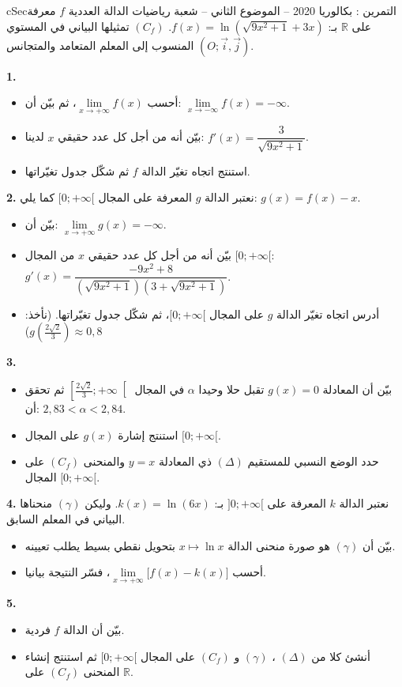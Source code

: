 \documentclass[12pt,a4paper]{article}
\newenvironment{BOX}[2]{\begin{otherlanguage}{english}\begin{arbox}{#1}{#2}}{\end{arbox}\end{otherlanguage}}
\newcounter{exo}
\newenvironment{tamrin}[1]{\stepcounter{exo}\begin{BOX}{cSec}{التمرين \theexo: #1}}{\end{BOX}}
\newcommand{\R}{\mathbb{R}}
\newenvironment{sq}{\begin{itemize}[leftmargin=2.4em,itemsep=3pt]}{\end{itemize}}
\newcommand{\qa}{\item[(أ)]}\newcommand{\qb}{\item[(ب)]}\newcommand{\qc}{\item[(جـ)]}\newcommand{\qd}{\item[(د)]}\newcommand{\qe}{\item[(هـ)]}
\newcommand{\QQ}[1]{\par\smallskip\textbf{#1.} }
\begin{document}
\begin{tamrin}{بكالوريا 2020 -- الموضوع الثاني -- شعبة رياضيات}
الدالة العددية $f$ معرفة على $\R$ بـ: $f(x)=\ln\left(\sqrt{9x^2+1}+3x\right)$.
$(C_f)$ تمثيلها البياني في المستوي المنسوب إلى المعلم المتعامد والمتجانس $(O;\vec i,\vec j)$.
\QQ{1}
\begin{sq}
\qa أحسب $\lim\limits_{x\to +\infty}f(x)$، ثم بيّن أن: $\lim\limits_{x\to -\infty}f(x)=-\infty$.
\qb بيّن أنه من أجل كل عدد حقيقي $x$ لدينا: $f'(x)=\dfrac{3}{\sqrt{9x^2+1}}$.
\qc استنتج اتجاه تغيّر الدالة $f$ ثم شكّل جدول تغيّراتها.
\end{sq}
\QQ{2} نعتبر الدالة $g$ المعرفة على المجال $[0;+\infty[$ كما يلي: $g(x)=f(x)-x$.
\begin{sq}
\qa بيّن أن: $\lim\limits_{x\to +\infty}g(x)=-\infty$.
\qb بيّن أنه من أجل كل عدد حقيقي $x$ من المجال $[0;+\infty[$: $g'(x)=\dfrac{-9x^2+8}{\left(\sqrt{9x^2+1}\right)\left(3+\sqrt{9x^2+1}\right)}$.
\qc أدرس اتجاه تغيّر الدالة $g$ على المجال $[0;+\infty[$، ثم شكّل جدول تغيّراتها. (نأخذ: $g\left(\frac{2\sqrt2}{3}\right)\approx 0{,}8$)
\end{sq}
\QQ{3}
\begin{sq}
\qa بيّن أن المعادلة $g(x)=0$ تقبل حلا وحيدا $\alpha$ في المجال $\left[\frac{2\sqrt2}{3};+\infty\right[$ ثم تحقق أن: $2{,}83<\alpha<2{,}84$.
\qb استنتج إشارة $g(x)$ على المجال $[0;+\infty[$.
\qc حدد الوضع النسبي للمستقيم $(\Delta)$ ذي المعادلة $y=x$ والمنحنى $(C_f)$ على المجال $[0;+\infty[$.
\end{sq}
\QQ{4} نعتبر الدالة $k$ المعرفة على $]0;+\infty[$ بـ: $k(x)=\ln(6x)$. وليكن $(\gamma)$ منحناها البياني في المعلم السابق.
\begin{sq}
\qa بيّن أن $(\gamma)$ هو صورة منحنى الدالة $x\mapsto\ln x$ بتحويل نقطي بسيط يطلب تعيينه.
\qb أحسب $\lim\limits_{x\to +\infty}\big[f(x)-k(x)\big]$، فسّر النتيجة بيانيا.
\end{sq}
\QQ{5}
\begin{sq}
\qa بيّن أن الدالة $f$ فردية.
\qb أنشئ كلا من $(\Delta)$ ، $(\gamma)$ و $(C_f)$ على المجال $[0;+\infty[$ ثم استنتج إنشاء المنحنى $(C_f)$ على $\R$.
\end{sq}
\end{tamrin}
\end{document}

